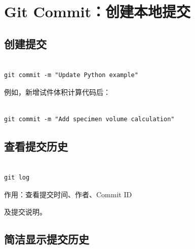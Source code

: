 



\section{Git Commit：创建本地提交}



\subsection{创建提交}



\begin{lstlisting}

git commit -m "Update Python example"

\end{lstlisting}








例如，新增试件体积计算代码后：



\begin{lstlisting}

git commit -m "Add specimen volume calculation"

\end{lstlisting}



\subsection{查看提交历史}



\begin{lstlisting}

git log

\end{lstlisting}



作用：查看提交时间、作者、Commit ID

及提交说明。



\subsection{简洁显示提交历史}



